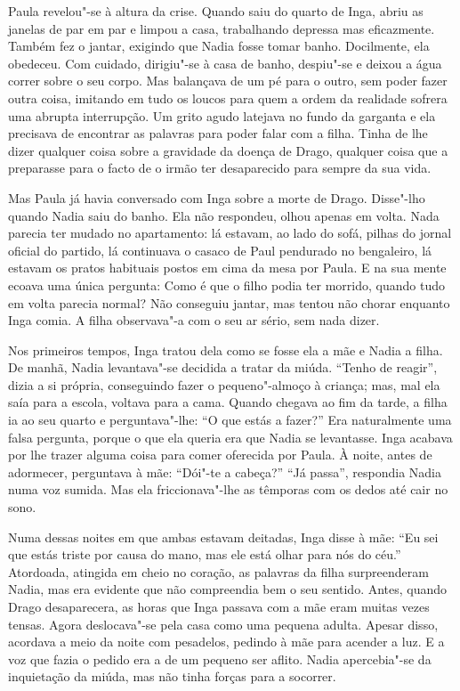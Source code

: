 Paula revelou"-se à altura da crise. Quando saiu do quarto de Inga, abriu
as janelas de par em par e limpou a casa, trabalhando depressa mas
eficazmente. Também fez o jantar, exigindo que Nadia fosse tomar banho.
Docilmente, ela obedeceu. Com cuidado, dirigiu"-se à casa de banho,
despiu"-se e deixou a água correr sobre o seu corpo. Mas balançava de um
pé para o outro, sem poder fazer outra coisa, imitando em tudo os loucos
para quem a ordem da realidade sofrera uma abrupta interrupção. Um grito
agudo latejava no fundo da garganta e ela precisava de encontrar as
palavras para poder falar com a filha.
Tinha de lhe dizer qualquer coisa sobre a gravidade da doença de Drago,
qualquer coisa que a preparasse para o facto de o irmão ter desaparecido
para sempre da sua vida.

Mas Paula já havia conversado com Inga sobre a
morte de Drago. Disse"-lho quando Nadia saiu do banho. Ela não respondeu,
olhou apenas em volta. Nada parecia ter mudado no apartamento: lá
estavam, ao lado do sofá, pilhas do jornal oficial do partido, lá
continuava o casaco de Paul pendurado no bengaleiro, lá estavam os
pratos habituais postos em cima da mesa por Paula. E na sua mente ecoava
uma única pergunta: Como é que o filho podia ter morrido, quando tudo em
volta parecia normal? Não conseguiu jantar, mas tentou não chorar
enquanto Inga comia. A filha observava"-a com o seu ar sério, sem
nada dizer.

Nos primeiros tempos, Inga tratou dela como se fosse ela a mãe e Nadia a
filha. De manhã, Nadia levantava"-se decidida a tratar da miúda. ``Tenho
de reagir'', dizia a si própria, conseguindo fazer o pequeno"-almoço à
criança; mas, mal ela saía para a escola, voltava para a cama. Quando
chegava ao fim da tarde, a filha ia ao seu quarto e perguntava"-lhe: ``O
que estás a fazer?'' Era naturalmente uma falsa pergunta, porque o que
ela queria era que Nadia se levantasse. Inga acabava por lhe trazer
alguma coisa para comer oferecida por Paula. À noite, antes de adormecer, perguntava à mãe: ``Dói"-te a cabeça?'' ``Já passa'', respondia Nadia
numa voz sumida. Mas ela friccionava"-lhe as têmporas com os dedos até
cair no sono.

Numa dessas noites em que ambas estavam deitadas,
Inga disse à mãe: ``Eu sei que estás triste por causa do
mano, mas ele está olhar para nós do céu.'' Atordoada, atingida em cheio
no coração, as palavras da filha surpreenderam Nadia, mas era evidente
que não compreendia bem o seu sentido. Antes, quando Drago desaparecera,
as horas que Inga passava com a mãe eram muitas vezes tensas. Agora
deslocava"-se pela casa como uma pequena adulta. Apesar disso, acordava a
meio da noite com pesadelos, pedindo à mãe para acender a luz. E a voz
que fazia o pedido era a de um pequeno ser aflito. Nadia apercebia"-se da inquietação da miúda, mas não tinha forças para a socorrer.

